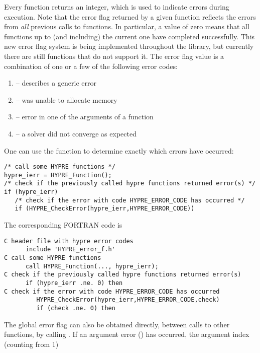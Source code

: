 Every \hypre{} function returns an integer, which is used to indicate errors
during execution.  Note that the error flag returned by a given function
reflects the errors from {\em all} previous calls to \hypre{} functions.  In
particular, a value of zero means that all \hypre{} functions up to (and
including) the current one have completed successfully.  This new error flag
system is being implemented throughout the library, but currently there are
still functions that do not support it.  The error flag value is a combination
of one or a few of the following error codes:
\begin{enumerate}
\item {} -- describes a generic error
\item {} -- \hypre{} was unable to allocate memory
\item {} -- error in one of the arguments of a \hypre{} function
\item {} -- a \hypre{} solver did not converge as expected
\end{enumerate}
One can use the  function to determine exactly which
errors have occurred:
\begin{display} \begin{verbatim}
/* call some HYPRE functions */
hypre_ierr = HYPRE_Function();
/* check if the previously called hypre functions returned error(s) */
if (hypre_ierr)
   /* check if the error with code HYPRE_ERROR_CODE has occurred */
   if (HYPRE_CheckError(hypre_ierr,HYPRE_ERROR_CODE))
\end{verbatim} \end{display}
The corresponding FORTRAN code is
\begin{display} \begin{verbatim}
C header file with hypre error codes
      include 'HYPRE_error_f.h'
C call some HYPRE functions
      call HYPRE_Function(..., hypre_ierr);
C check if the previously called hypre functions returned error(s)
      if (hypre_ierr .ne. 0) then
C check if the error with code HYPRE_ERROR_CODE has occurred
         HYPRE_CheckError(hypre_ierr,HYPRE_ERROR_CODE,check)
         if (check .ne. 0) then
\end{verbatim} \end{display}
The global error flag can also be obtained directly, between calls to other
\hypre{} functions, by calling .  If an argument error
() has occurred, the argument index (counting from 1)
